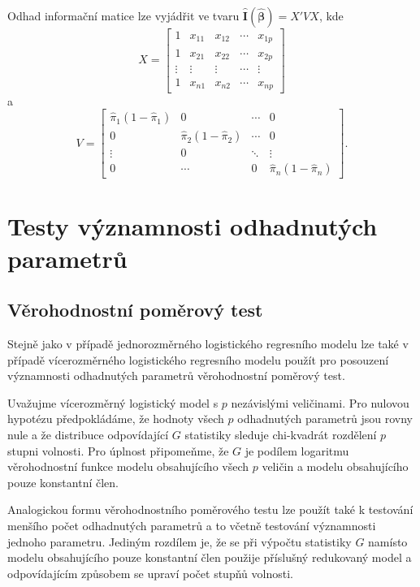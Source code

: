 Odhad informační matice lze vyjádřit ve tvaru $\hat{\pmb{I}}(\hat{\pmb{\beta}}) = X'VX$, kde
\begin{equation}
X =
\begin{bmatrix}
1 & x_{11} & x_{12} & \cdots & x_{1p}\\
1 & x_{21} & x_{22} & \cdots & x_{2p}\\
\vdots & \vdots & \vdots & \cdots & \vdots\\
1 & x_{n1} & x_{n2} & \cdots & x_{np}
\end{bmatrix}
\end{equation}
a
\begin{equation}
V =
\begin{bmatrix}
\hat{\pi}_1 (1 - \hat{\pi}_1) & 0 & \cdots & 0\\
0 & \hat{\pi}_2(1 - \hat{\pi}_2) & \cdots & 0\\
\vdots & 0 & \ddots & \vdots\\
0 & \cdots & 0 & \hat{\pi}_n (1 - \hat{\pi}_n) 
\end{bmatrix}.
\end{equation}

\section{Testy významnosti odhadnutých parametrů}

\subsection{Věrohodnostní poměrový test}

Stejně jako v případě jednorozměrného logistického regresního modelu lze také v případě vícerozměrného logistického regresního modelu použít pro posouzení významnosti odhadnutých parametrů věrohodnostní poměrový test.

Uvažujme vícerozměrný logistický model s $p$ nezávislými veličinami. Pro nulovou hypotézu předpokládáme, že hodnoty všech $p$ odhadnutých parametrů jsou rovny nule a že distribuce odpovídající $G$ statistiky sleduje chi-kvadrát rozdělení $p$ stupni volnosti. Pro úplnost připomeňme, že $G$ je podílem logaritmu věrohodnostní funkce modelu obsahujícího všech $p$ veličin a modelu obsahujícího pouze konstantní člen.

Analogickou formu věrohodnostního poměrového testu lze použít také k testování menšího počet odhadnutých parametrů a to včetně testování významnosti jednoho parametru. Jediným rozdílem je, že se při výpočtu statistiky $G$ namísto modelu obsahujícího pouze konstantní člen použije příslušný redukovaný model a odpovídajícím způsobem se upraví počet stupňů volnosti.


